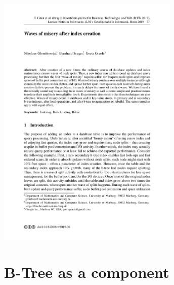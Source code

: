 \documentclass[usenames,dvipsnames, 18pt, compress, aspectratio=169]{beamer}
\begin{document}
\begin{frame}[fragile]{}
    \frametitle{}

    \begin{center}
        \includegraphics[width=0.65\textwidth,center]{waves.png}
    \end{center}
\end{frame}

\section{B-Tree as a component}
\end{document}
